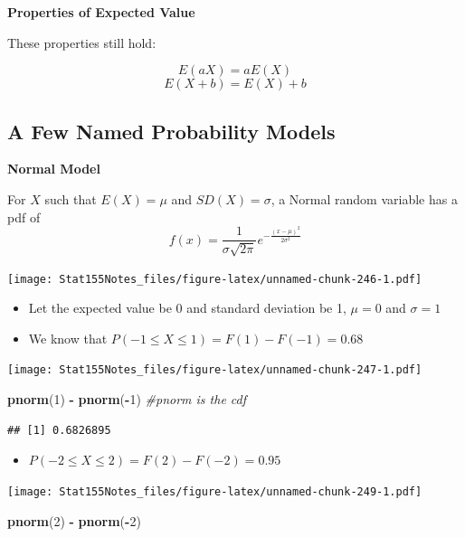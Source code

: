 \documentclass[]{book}
\newenvironment{Shaded}{\begin{snugshade}}{\end{snugshade}}
\newcommand{\CommentTok}[1]{\textcolor[rgb]{0.56,0.35,0.01}{\textit{#1}}}
\newcommand{\DecValTok}[1]{\textcolor[rgb]{0.00,0.00,0.81}{#1}}
\newcommand{\KeywordTok}[1]{\textcolor[rgb]{0.13,0.29,0.53}{\textbf{#1}}}
\newcommand{\NormalTok}[1]{#1}
\newcommand{\OperatorTok}[1]{\textcolor[rgb]{0.81,0.36,0.00}{\textbf{#1}}}
\newcommand{\StringTok}[1]{\textcolor[rgb]{0.31,0.60,0.02}{#1}}
\providecommand{\tightlist}{%
  \setlength{\itemsep}{0pt}\setlength{\parskip}{0pt}}
\begin{document}
\textbf{Properties of Expected Value}

These properties still hold:

\[ E(aX) =  aE(X)\]
\[E(X+b) = E(X) + b\]

\hypertarget{a-few-named-probability-models-1}{%
\subsection{A Few Named Probability Models}\label{a-few-named-probability-models-1}}

\textbf{Normal Model}

For \(X\) such that \(E(X) = \mu\) and \(SD(X) = \sigma\), a Normal random variable has a pdf of
\[f(x) =  \frac{1}{\sigma\sqrt{2\pi}}e^{-\frac{(x-\mu)^2}{2\sigma^2}}\]

\texttt{[image: Stat155Notes\_files/figure-latex/unnamed-chunk-246-1.pdf]}

\begin{itemize}
\item
  Let the expected value be 0 and standard deviation be 1, \(\mu = 0\) and \(\sigma = 1\)
\item
  We know that \(P(-1\leq X \leq 1) = F(1) - F(-1) = 0.68\)
\end{itemize}

\texttt{[image: Stat155Notes\_files/figure-latex/unnamed-chunk-247-1.pdf]}

\begin{Shaded}
\begin{Highlighting}[]
\KeywordTok{pnorm}\NormalTok{(}\DecValTok{1}\NormalTok{) }\OperatorTok{-}\StringTok{ }\KeywordTok{pnorm}\NormalTok{(}\OperatorTok{-}\DecValTok{1}\NormalTok{) }\CommentTok{#pnorm is the cdf}
\end{Highlighting}
\end{Shaded}

\begin{verbatim}
## [1] 0.6826895
\end{verbatim}

\begin{itemize}
\tightlist
\item
  \(P(-2\leq X \leq 2) = F(2) - F(-2) = 0.95\)
\end{itemize}

\texttt{[image: Stat155Notes\_files/figure-latex/unnamed-chunk-249-1.pdf]}

\begin{Shaded}
\begin{Highlighting}[]
\KeywordTok{pnorm}\NormalTok{(}\DecValTok{2}\NormalTok{) }\OperatorTok{-}\StringTok{ }\KeywordTok{pnorm}\NormalTok{(}\OperatorTok{-}\DecValTok{2}\NormalTok{)}
\end{Highlighting}
\end{Shaded}
\end{document}
